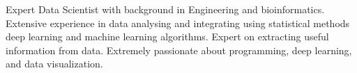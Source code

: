\small{Expert Data Scientist with background in Engineering  and bioinformatics. Extensive experience in data analysing and integrating using statistical methods deep learning and machine learning algorithms. Expert on extracting useful information from data. Extremely
passionate about programming, deep learning, and data visualization.}


